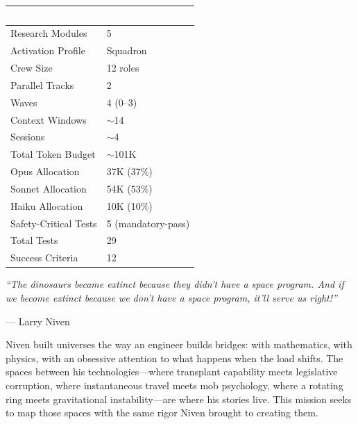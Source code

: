 \documentclass[11pt,letterpaper]{article}
\newcommand{\tableheader}[1]{\textbf{\sffamily\textcolor{white}{#1}}}
\begin{document}
\begin{center}
\begin{tabularx}{\textwidth}{L{4cm}X}
\toprule
{}
\tableheader{Metric} & \tableheader{Value} \\
\midrule
Research Modules & 5 \\
Activation Profile & Squadron \\
Crew Size & 12 roles \\
Parallel Tracks & 2 \\
Waves & 4 (0--3) \\
Context Windows & $\sim$14 \\
Sessions & $\sim$4 \\
Total Token Budget & $\sim$101K \\
Opus Allocation & 37K (37\%) \\
Sonnet Allocation & 54K (53\%) \\
Haiku Allocation & 10K (10\%) \\
Safety-Critical Tests & 5 (mandatory-pass) \\
Total Tests & 29 \\
Success Criteria & 12 \\
\bottomrule
\end{tabularx}
\end{center}

\vspace{1em}

\begin{quotebox}
\textit{``The dinosaurs became extinct because they didn't have a space program. And if we become extinct because we don't have a space program, it'll serve us right!''}

\vspace{0.5em}
\hfill --- Larry Niven

\vspace{1em}
Niven built universes the way an engineer builds bridges: with mathematics, with physics, with an obsessive attention to what happens when the load shifts. The spaces between his technologies---where transplant capability meets legislative corruption, where instantaneous travel meets mob psychology, where a rotating ring meets gravitational instability---are where his stories live. This mission seeks to map those spaces with the same rigor Niven brought to creating them.
\end{quotebox}
\end{document}
